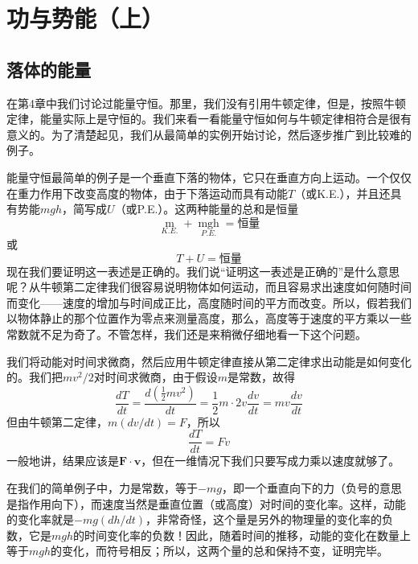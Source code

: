 \chapter{功与势能（上）}

\section{落体的能量}

在第4章中我们讨论过能量守恒。那里，我们没有引用牛顿定律，但是，按照牛顿定律，能量实际上是守恒的。我们来看一看能量守恒如何与牛顿定律相符合是很有意义的。为了清楚起见，我们从最简单的实例开始讨论，然后逐步推广到比较难的例子。

能量守恒最简单的例子是一个垂直下落的物体，它只在垂直方向上运动。一个仅仅在重力作用下改变高度的物体，由于下落运动而具有动能$T$（或K.E.），并且还具有势能$mgh$，简写成$U$（或P.E.）。这两种能量的总和是恒量
\begin{equation*}
    \mathop{\frac{1}{2}mv^2}\limits_{K.E.}+\mathop{mgh}\limits_{P.E.}=\text{恒量}
\end{equation*}
或
\begin{equation}
    \label{Eq:I:13:1}
    T+U=\text{恒量}
\end{equation}
现在我们要证明这一表述是正确的。我们说“证明这一表述是正确的”是什么意思呢？从牛顿第二定律我们很容易说明物体如何运动，而且容易求出速度如何随时间而变化——速度的增加与时间成正比，高度随时间的平方而改变。所以，假若我们以物体静止的那个位置作为零点来测量高度，那么，高度等于速度的平方乘以一些常数就不足为奇了。不管怎样，我们还是来稍微仔细地看一下这个问题。

我们将动能对时间求微商，然后应用牛顿定律直接从第二定律求出动能是如何变化的。我们把$mv^2/2$对时间求微商，由于假设$m$是常数，故得
\begin{equation}
    \label{Eq:I:13:2}
    \frac{dT}{dt}=\frac{d(\frac{1}{2}mv^2)}{dt}=\frac{1}{2}m \cdot 2v \frac{dv}{dt}=mv\frac{dv}{dt}
\end{equation}
但由牛顿第二定律，$m(dv/dt)=F$，所以
\begin{equation}
    \label{Eq:I:13:3}
    \frac{dT}{dt}=Fv
\end{equation}
一般地讲，结果应该是$\boldsymbol{F} \cdot \boldsymbol{v}$，但在一维情况下我们只要写成力乘以速度就够了。

在我们的简单例子中，力是常数，等于$-mg$，即一个垂直向下的力（负号的意思是指作用向下），而速度当然是垂直位置（或高度）对时间的变化率。这样，动能的变化率就是$-mg(dh/dt)$，非常奇怪，这个量是另外的物理量的变化率的负数，它是$mgh$的时间变化率的负数！因此，随着时间的推移，动能的变化在数量上等于$mgh$的变化，而符号相反；所以，这两个量的总和保持不变，证明完毕。

